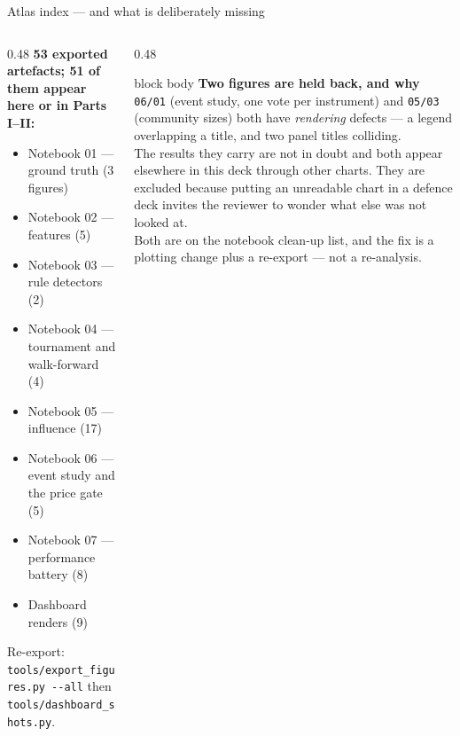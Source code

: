 \documentclass[aspectratio=169,11pt]{beamer}
\begin{document}
\begin{frame}{Atlas index --- and what is deliberately missing}
  \footnotesize
  \begin{columns}[T]
    \begin{column}{0.48\linewidth}
      \textbf{53 exported artefacts; 51 of them appear here or in Parts
      I--II:}
      \begin{itemize}
        \item Notebook 01 --- ground truth (3 figures)
        \item Notebook 02 --- features (5)
        \item Notebook 03 --- rule detectors (2)
        \item Notebook 04 --- tournament and walk-forward (4)
        \item Notebook 05 --- influence (17)
        \item Notebook 06 --- event study and the price gate (5)
        \item Notebook 07 --- performance battery (8)
        \item Dashboard renders (9)
      \end{itemize}
      \vspace{0.4em}
      Re-export: \texttt{tools/export\_figures.py -{}-all} then
      \texttt{tools/dashboard\_shots.py}.
    \end{column}
    \begin{column}{0.48\linewidth}
      \begin{beamercolorbox}[wd=\linewidth,sep=0.8em]{block body}
        \textbf{\color{gicnavy}Two figures are held back, and why}
        \\[0.4em]
        \texttt{06/01} (event study, one vote per instrument) and
        \texttt{05/03} (community sizes) both have \emph{rendering} defects
        --- a legend overlapping a title, and two panel titles colliding.
        \\[0.5em]
        The results they carry are not in doubt and both appear elsewhere in
        this deck through other charts. They are excluded because putting an
        unreadable chart in a defence deck invites the reviewer to wonder what
        else was not looked at.
        \\[0.5em]
        Both are on the notebook clean-up list, and the fix is a plotting
        change plus a re-export --- not a re-analysis.
      \end{beamercolorbox}
    \end{column}
  \end{columns}
\end{frame}
\end{document}

